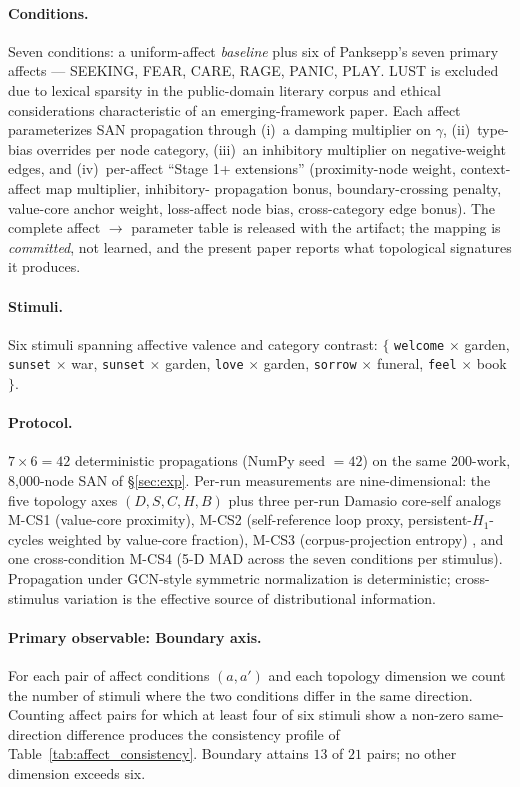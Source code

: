 \documentclass{article}
\begin{document}
\paragraph{Conditions.}
Seven conditions: a uniform-affect \emph{baseline} plus six of Panksepp's
seven primary affects \cite{panksepp2012archaeology} ---
SEEKING, FEAR, CARE, RAGE, PANIC, PLAY. LUST is excluded due to lexical
sparsity in the public-domain literary corpus and ethical considerations
characteristic of an emerging-framework paper. Each affect parameterizes
SAN propagation through (i)~a damping multiplier on $\gamma$,
(ii)~type-bias overrides per node category, (iii)~an inhibitory multiplier
on negative-weight edges, and (iv)~per-affect ``Stage 1+ extensions''
(proximity-node weight, context-affect map multiplier, inhibitory-
propagation bonus, boundary-crossing penalty, value-core anchor weight,
loss-affect node bias, cross-category edge bonus). The complete
affect $\to$ parameter table is released with the artifact; the mapping is
\emph{committed}, not learned, and the present paper reports what
topological signatures it produces.

\paragraph{Stimuli.}
Six stimuli spanning affective valence and category contrast:
$\{$ \texttt{welcome} $\times$ garden, \texttt{sunset} $\times$ war,
\texttt{sunset} $\times$ garden, \texttt{love} $\times$ garden,
\texttt{sorrow} $\times$ funeral, \texttt{feel} $\times$ book $\}$.

\paragraph{Protocol.}
$7 \times 6 = 42$ deterministic propagations (NumPy seed $=42$) on the
same 200-work, 8{,}000-node SAN of \S\ref{sec:exp}. Per-run measurements
are nine-dimensional: the five topology axes $(D, S, C, H, B)$ plus three
per-run Damasio core-self analogs M-CS1 (value-core proximity), M-CS2
(self-reference loop proxy, persistent-$H_1$-cycles weighted by value-core
fraction), M-CS3 (corpus-projection entropy)
\cite{damasio2010selfcomes, edelman1989neural, northoff2016self},
and one cross-condition M-CS4 (5-D MAD across the seven conditions per
stimulus). Propagation under GCN-style symmetric normalization is
deterministic; cross-stimulus variation is the effective source of
distributional information.

\paragraph{Primary observable: Boundary axis.}
For each pair of affect conditions $(a, a')$ and each topology dimension we
count the number of stimuli where the two conditions differ in the same
direction. Counting affect pairs for which at least four of six stimuli
show a non-zero same-direction difference produces the consistency
profile of Table~\ref{tab:affect_consistency}. Boundary attains $13$ of
$21$ pairs; no other dimension exceeds six.
\end{document}
